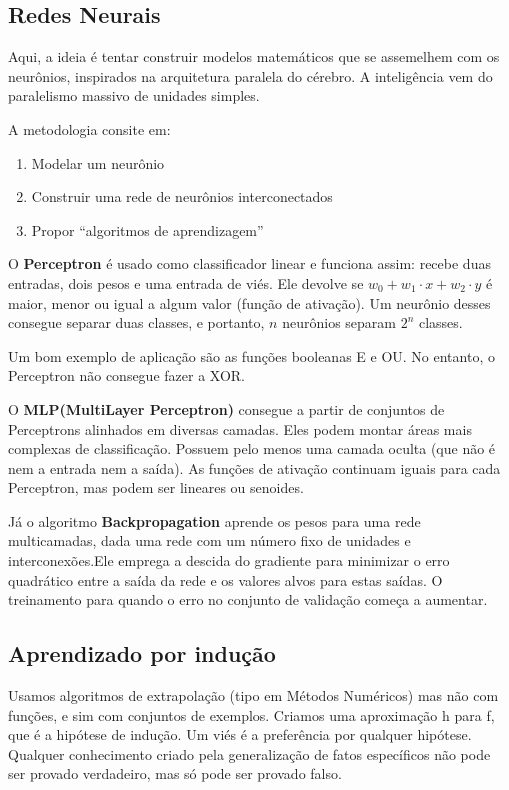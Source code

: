 \documentclass[12pt,letterpaper]{article}
\begin{document}
	\subsection*{Redes Neurais}
	
	Aqui, a ideia é tentar construir modelos matemáticos que se assemelhem com os neurônios, inspirados na arquitetura paralela do cérebro. A inteligência vem do paralelismo massivo de unidades simples. 
	
	A metodologia consite em:
	
	\begin{enumerate}
		\item Modelar um neurônio
		\item Construir uma rede de neurônios interconectados
		\item Propor “algoritmos de aprendizagem”
	\end{enumerate}
	
	O \textbf{Perceptron} é usado como classificador linear e funciona assim: recebe duas entradas, dois pesos e uma entrada de viés. Ele devolve se $w_0 + w_1\cdot x + w_2\cdot y$ é maior, menor ou igual a algum valor (função de ativação). Um neurônio desses consegue separar duas classes, e portanto, $n$ neurônios separam $2^n$ classes.
	
	Um bom exemplo de aplicação são as funções booleanas E e OU. No entanto, o Perceptron não consegue fazer a XOR.
	
	O \textbf{MLP(MultiLayer Perceptron)} consegue a partir de conjuntos de Perceptrons alinhados em diversas camadas. Eles podem montar áreas mais complexas de classificação. Possuem pelo menos uma camada oculta (que não é nem a entrada nem a saída). As funções de ativação continuam iguais para cada Perceptron, mas podem ser lineares ou senoides.
	
	Já o algoritmo \textbf{Backpropagation} aprende os pesos para uma rede multicamadas, dada uma rede com um número fixo de unidades e interconexões.Ele emprega a descida do gradiente para minimizar o erro quadrático entre a saída da rede e os valores alvos para estas saídas. O treinamento para quando o erro no conjunto de validação começa a aumentar.
	
	\subsection*{Aprendizado por indução}
	
	Usamos algoritmos de extrapolação (tipo em Métodos Numéricos) mas não com funções, e sim com conjuntos de exemplos. Criamos uma aproximação h para f, que é a hipótese de indução. Um viés é a preferência por qualquer hipótese. Qualquer conhecimento criado pela generalização de fatos específicos não pode ser provado verdadeiro, mas só pode ser	provado falso.
	
\end{document}

